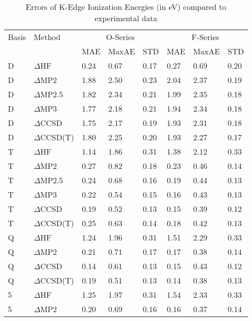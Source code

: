 \begin{table}
  \caption{Errors of K-Edge Ionization Energies (in eV) compared to experimental data}
  \label{tbl:of-series-wide}
  \begin{tabular}{l l l l l l l l }
    \toprule
    Basis & Method & \multicolumn{3}{c}{O-Series} & \multicolumn{3}{c}{F-Series} \\ 
     &  & MAE & MaxAE & STD & MAE & MaxAE & STD \\ 
    \midrule
    D & $\Delta$HF & 0.24 & 0.67 & 0.17 & 0.27 & 0.69 & 0.20 \\ 
    D & $\Delta$MP2 & 1.88 & 2.50 & 0.23 & 2.04 & 2.37 & 0.19 \\ 
    D & $\Delta$MP2.5 & 1.82 & 2.34 & 0.21 & 1.99 & 2.35 & 0.18 \\ 
    D & $\Delta$MP3 & 1.77 & 2.18 & 0.21 & 1.94 & 2.34 & 0.18 \\ 
    D & $\Delta$CCSD & 1.75 & 2.17 & 0.19 & 1.93 & 2.31 & 0.18 \\ 
    D & $\Delta$CCSD(T) & 1.80 & 2.25 & 0.20 & 1.93 & 2.27 & 0.17 \\ 
    T & $\Delta$HF & 1.14 & 1.86 & 0.31 & 1.38 & 2.12 & 0.33 \\ 
    T & $\Delta$MP2 & 0.27 & 0.82 & 0.18 & 0.23 & 0.46 & 0.14 \\ 
    T & $\Delta$MP2.5 & 0.24 & 0.68 & 0.16 & 0.19 & 0.44 & 0.13 \\ 
    T & $\Delta$MP3 & 0.22 & 0.54 & 0.15 & 0.16 & 0.43 & 0.13 \\ 
    T & $\Delta$CCSD & 0.19 & 0.52 & 0.13 & 0.15 & 0.39 & 0.12 \\ 
    T & $\Delta$CCSD(T) & 0.25 & 0.63 & 0.14 & 0.18 & 0.42 & 0.13 \\ 
    Q & $\Delta$HF & 1.24 & 1.96 & 0.31 & 1.51 & 2.29 & 0.33 \\ 
    Q & $\Delta$MP2 & 0.21 & 0.71 & 0.17 & 0.17 & 0.38 & 0.14 \\ 
    Q & $\Delta$CCSD & 0.14 & 0.61 & 0.13 & 0.15 & 0.43 & 0.12 \\ 
    Q & $\Delta$CCSD(T) & 0.19 & 0.51 & 0.13 & 0.14 & 0.38 & 0.13 \\ 
    5 & $\Delta$HF & 1.25 & 1.97 & 0.31 & 1.54 & 2.33 & 0.33 \\ 
    5 & $\Delta$MP2 & 0.20 & 0.69 & 0.16 & 0.16 & 0.37 & 0.14 \\ 
    \bottomrule
  \end{tabular}
\end{table}
